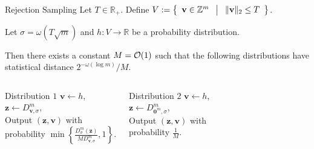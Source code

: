 \begin{frame}{Rejection Sampling}
	Let $T \in \mathbb{R}_+$. Define $V := \left\{ \begin{array}{c} \mathbf{v} \in \mathbb{Z}^m \end{array}\;\middle|\;\begin{array}{c} \lVert\mathbf{v}\rVert_{2} \leq T \end{array} \right\}$.
	
	Let $\sigma = \omega(T\sqrt{m})$ and $h : V \to \mathbb{R}$ be a probability distribution.
	
	Then there exists a constant $M = \mathcal{O}(1)$ such that the following distributions have statistical distance $2^{-\omega(\log m)}/ M$. 
	
	\begin{columns}[c]
			\begin{expt}{Distribution $1$}
				$\mathbf{v} \leftarrow h$,\\
				$\mathbf{z} \leftarrow D_{\mathbf{v}, \sigma}^m$,\\
				Output $(\mathbf{z}, \mathbf{v})$ with \\
				\qquad probability $\min\left\{\frac{D^m_\sigma(\mathbf{z})}{MD^m_{\mathbf{v},\sigma}}, 1\right\}$.\\
			\end{expt}
			\begin{expt}{Distribution $2$}
				$\mathbf{v} \leftarrow h$,\\
				$\mathbf{z} \leftarrow D_{\mathbf{0}^m, \sigma}^m$,\\
				Output $(\mathbf{z}, \mathbf{v})$ with \\
				\qquad probability $\frac{1}{M}$.\\
			\end{expt}
	\end{columns}
\end{frame}